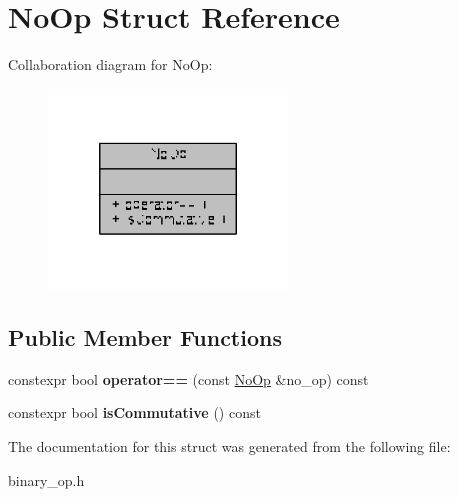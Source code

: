 \hypertarget{structNoOp}{\section{No\-Op Struct Reference}
\label{structNoOp}
}


Collaboration diagram for No\-Op\-:
\nopagebreak
\begin{figure}[H]
\begin{center}
\leavevmode
\includegraphics[width=180pt]{structNoOp__coll__graph}
\end{center}
\end{figure}
\subsection*{Public Member Functions}
\begin{DoxyCompactItemize}
\item 
\hypertarget{structNoOp_ae3a29e2449fd1b84179b0b44fd46f159}{constexpr bool {\bfseries operator==} (const \hyperlink{structNoOp}{No\-Op} \&no\-\_\-op) const }\label{structNoOp_ae3a29e2449fd1b84179b0b44fd46f159}

\item 
\hypertarget{structNoOp_a2e08fb12e6872cb4b2b3e299464c67ab}{constexpr bool {\bfseries is\-Commutative} () const }\label{structNoOp_a2e08fb12e6872cb4b2b3e299464c67ab}

\end{DoxyCompactItemize}


The documentation for this struct was generated from the following file\-:\begin{DoxyCompactItemize}
\item 
binary\-\_\-op.\-h\end{DoxyCompactItemize}
